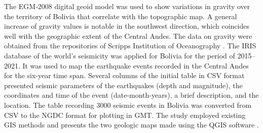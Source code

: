 \documentclass[data,article,accept,pdftex,moreauthors]{Definitions/mdpi}
\begin{document}
{The} EGM-2008 \cite{Pavlis} digital geoid model {was used} to show {variations} in gravity over the territory of Bolivia that {correlate} with the topographic map. %
{A} general increase of gravity values {is notable} in the southwest direction, which coincides {well} with the {geographic} extent of {the} Central Andes. The data on{ }gravity 
were obtained {from} the repositories of Scripps Institution of Oceanography \cite{Sandwelletal2014}. The IRIS database of the {world's} seismicity {was} applied for Bolivia for the period of 2015–2021. {It} was used to map the earthquake events recorded in the Central Andes for the six-year time span. %
Several columns of the initial table in CSV format presented seismic parameters of the earthquakes (depth and magnitude), the coordinates and time of the event (date-month-years), a {brief} description, and the location. The {table recording} 3000 seismic events in Bolivia {was} converted from CSV to the NGDC format {for plotting in} GMT. %
The study employed existing GIS methods \cite{Hubbard,Lemenkova202135,Suetova,Lemenkova202125,Klauco2013,Klauco2017} and presents the two geologic maps made using the QGIS software \cite{QGIS}.

\end{document}
